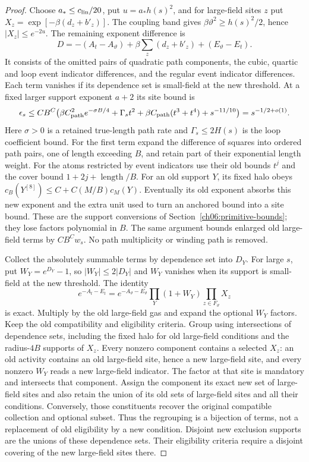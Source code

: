 \begin{proof}
Choose $a_*\le c_{\rm lin}/20$, put $u=a_*h(s)^2$, and for large-field sites
$z$ put $X_z=\exp[-\beta(d_z+b'_z)]$. The coupling band gives
$\beta\vartheta^2\ge h(s)^2/2$, hence $|X_z|\le e^{-2u}$.
The remaining exponent difference is
\[
 D=-(A_t-A_\vartheta)+\beta\sum_z(d_z+b'_z)
                               +(E_\vartheta-E_t).
\]
It consists of the omitted pairs of quadratic path components, the cubic, quartic
and loop event indicator differences, and the regular event indicator differences.
Each term vanishes if its dependence set is small-field at the new threshold.
At a fixed larger support exponent $a+2$ its site bound is
\begin{equation}
 \epsilon_s\le C B^C\bigl(
 \beta C_{\rm path}^2e^{-\sigma B/4}
 +\Gamma_s t^2+\beta C_{\rm path}(t^3+t^4)+s^{-11/10}\bigr)
                  =s^{-1/2+o(1)}.
 \label{ch11:restart-endpoint-error}
\end{equation}
Here $\sigma>0$ is a retained true-length path rate and
$\Gamma_s\le2H(s)$ is the loop coefficient bound.
For the first term expand the difference of squares into ordered
path pairs, one of length exceeding $B$, and retain part of their
exponential length weight. For the atoms restricted by event indicators use their old
bounds $t^j$ and the cover bound $1+2j+\operatorname{length}/B$.
For an old support $Y$, its fixed halo obeys
$c_B(Y^{[8]})\le C+C(M/B)c_M(Y)$. Eventually its old exponent
absorbs this new exponent and the extra unit used to turn an anchored
bound into a site bound. These are the support conversions of
Section~\ref{ch06:primitive-bounds}; they lose factors polynomial in
$B$. The same argument bounds enlarged old large-field terms by
$CB^Cw_s$. No path multiplicity or winding path is removed.

Collect the absolutely summable terms by dependence set into $D_Y$.
For large $s$, put $W_Y=e^{D_Y}-1$, so $|W_Y|\le2|D_Y|$ and
$W_Y$ vanishes when its support is small-field at the new threshold. The identity
\begin{equation}
 e^{-A_t-E_t}=e^{-A_\vartheta-E_\vartheta}
                \prod_Y(1+W_Y)\prod_{z\in F_\vartheta}X_z
 \label{ch11:restart-endpoint-identity}
\end{equation}
is exact. Multiply by the old large-field gas and expand the optional
$W_Y$ factors. Keep the old compatibility and eligibility criteria.
Group using intersections of dependence sets, including the fixed
halo for old large-field conditions and the radius-$4B$ supports of $X_z$.
Every nonzero component contains a selected $X_z$: an old activity
contains an old large-field site, hence a new large-field site, and every nonzero $W_Y$
reads a new large-field indicator. The factor at that site is mandatory and intersects
that component. Assign the component its exact new set of large-field sites and also
retain the union of its old sets of large-field sites and all their conditions.
Conversely, those constituents recover the original compatible
collection and optional subset. Thus the regrouping is a bijection
of terms, not a replacement of old eligibility by a new condition.
Disjoint new exclusion supports are the unions of these
dependence sets. Their eligibility criteria require a disjoint covering of the new large-field sites there.


\end{proof}
